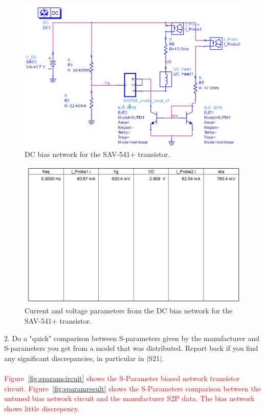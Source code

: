\documentclass[conference]{IEEEtran}
\begin{document}
\begin{figure}[!h]
\centering
\includegraphics[scale=0.35]{pics/dcbiascircuit.png}
\caption{DC bias network for the SAV-541+ transistor.}
\label{fig:dccircuit}
\end{figure}
\begin{figure}[!h]
\centering
\includegraphics[scale=0.31]{pics/biasvalues.png}
\caption{Current and voltage  parameters from the DC bias network for the SAV-541+ transistor.}
\label{fig:dcvalues}
\end{figure}
2. Do a "quick" comparison between S-parameters given by the manufacturer and S-parameters you get from a model that was distributed. Report back if you find any significant discrepancies, in particular in $|$S21$|$.\\\\
\textcolor{red}{Figure~\ref{fig:sparamcircuit} shows the S-Parameter biased network transistor circuit.  Figure~\ref{fig:sparamresult} shows the S-Parameters comparison between the untuned bias network circuit and the manufacturer S2P data.  The bias network shows little discrepency.}
\end{document}
